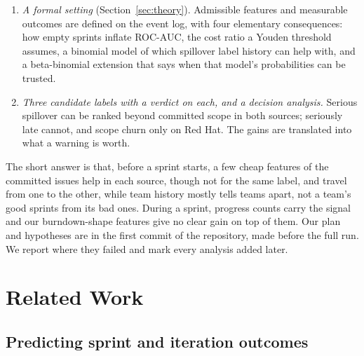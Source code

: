 \documentclass[journal]{IEEEtran}
\begin{document}
\begin{enumerate}
\item \emph{A formal setting} (Section~\ref{sec:theory}). Admissible features and measurable outcomes are defined on the event log, with four elementary consequences: how empty sprints inflate ROC-AUC, the cost ratio a Youden threshold assumes, a binomial model of which spillover label history can help with, and a beta-binomial extension that says when that model's probabilities can be trusted.
\item \emph{Three candidate labels with a verdict on each, and a decision analysis.} Serious spillover can be ranked beyond committed scope in both sources; seriously late cannot, and scope churn only on Red Hat. The gains are translated into what a warning is worth.
\end{enumerate}

The short answer is that, before a sprint starts, a few cheap features of the committed issues help in each source, though not for the same label, and travel from one to the other, while team history mostly tells teams apart, not a team's good sprints from its bad ones. During a sprint, progress counts carry the signal and our burndown-shape features give no clear gain on top of them. Our plan and hypotheses are in the first commit of the repository, made before the full run. We report where they failed and mark every analysis added later.

\section{Related Work}
\label{sec:related}

\subsection{Predicting sprint and iteration outcomes}
\end{document}
